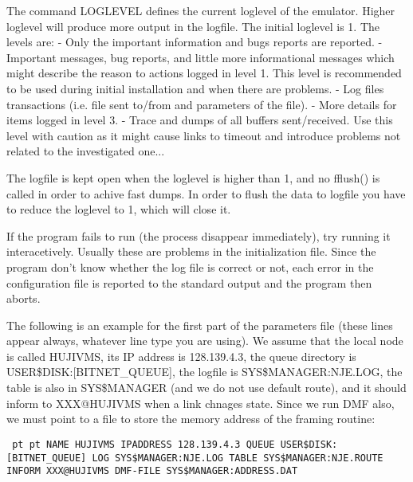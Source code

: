 The  command  LOGLEVEL  defines the current loglevel of the emulator.
Higher loglevel will produce more output in  the  logfile.  The  initial
loglevel is 1. The levels are:
\hfill\break
{} - Only the important information and bugs reports are reported.
\hfill\break
{} - Important messages, bug reports, and little more informational
messages which might describe the reason to actions logged in  level  1.
This  level  is  recommended  to be used during initial installation and
when there are problems.
\hfill\break
{} - Log files transactions (i.e. file sent to/from and parameters
of the file).
\hfill\break
{} - More details for items logged in level 3.
\hfill\break
{} - Trace and dumps of all buffers sent/received. Use this level with
caution as it might cause links to timeout and  introduce  problems  not
related to the investigated one...

The  logfile  is kept open when the loglevel is higher than 1, and no
{\ncrBold fflush()} is called in order to achive fast dumps.
In order to flush  the
data  to  logfile you have to reduce the loglevel to 1, which will close it.

{\ncrBold If the program fails to run} (the process disappear immediately),  try
running   it   interacetively.   Usually   these  are  problems  in  the
initialization file. Since the program don't know whether the  log  file
is  correct  or not, each error in the configuration file is reported to
the standard output and the program then aborts.

\vfill\eject


The following is an example for the first part of the parameters file
(these lines appear always, whatever line type you are using). We assume
that the local node is called HUJIVMS, its IP  address  is  128.139.4.3,
the   queue   directory  is  USER\$DISK:[BITNET\_QUEUE],  the  logfile  is
SYS\$MANAGER:NJE.LOG, the table is also in SYS\$MANAGER (and we do not use
default  route), and it should inform to XXX@HUJIVMS when a link chnages
state. Since we run DMF also, we must point  to  a  file  to  store  the
memory address of the framing routine:

{\obeylines\obeyspaces\tt{} pt  pt
NAME  HUJIVMS
IPADDRESS  128.139.4.3
QUEUE  USER\$DISK:[BITNET\_QUEUE]
LOG  SYS\$MANAGER:NJE.LOG
TABLE  SYS\$MANAGER:NJE.ROUTE
INFORM  XXX@HUJIVMS
DMF-FILE SYS\$MANAGER:ADDRESS.DAT
}

